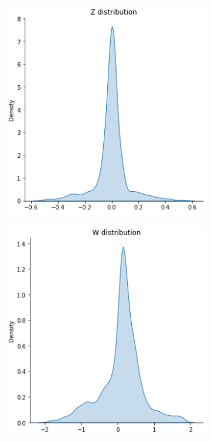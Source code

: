 \begin{figure}[!h]
\begin{center}
\begin{subfigure}[h]{0.24\textwidth}
		\end{subfigure}
		\hfill
		\begin{subfigure}[h]{0.24\textwidth}
			\centering
			\includegraphics[width=1\textwidth]{"contents/images/distributions/z-regr"}
		\end{subfigure}
		\hfill
		\begin{subfigure}[h]{0.24\textwidth}
			\centering
			\includegraphics[width=1\textwidth]{"contents/images/distributions/w-regr"}

\end{subfigure}
\end{center}
\end{figure}
